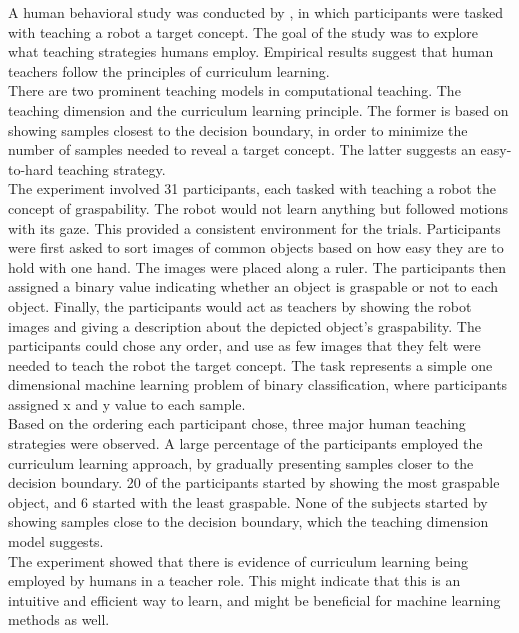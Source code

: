 


A human behavioral study was conducted by \citep{Khan_human_teach}, in which participants were tasked with teaching a robot a target concept. The goal of the study was to explore what teaching strategies humans employ. Empirical results suggest that human teachers follow the principles of curriculum learning. \\

There are two prominent teaching models in computational teaching. The teaching dimension and the curriculum  learning principle. The former is based on showing samples closest to the decision boundary, in order to minimize the number of samples needed to reveal a target concept. The latter suggests an easy-to-hard teaching strategy. \\

The experiment involved 31 participants, each tasked with teaching a robot the concept of graspability. The robot would not learn anything but followed motions with its gaze. This provided a consistent environment for the trials. Participants were first asked to sort images of common objects based on how easy they are to hold with one hand. The images were placed along a ruler.  The participants then assigned a binary value indicating whether an object is graspable or not to each object. Finally, the participants would act as teachers by showing the robot images and giving a description about the depicted object's graspability. The participants could chose any order, and use as few images that they felt were needed to teach the robot the target concept. The task represents a simple one dimensional machine learning problem of binary classification, where participants assigned x and y value to each sample. \\

Based on the ordering each participant chose, three major human teaching strategies were observed. A large percentage of the participants employed the curriculum learning approach, by gradually presenting samples closer to the decision boundary. 20 of the participants started by showing the most graspable object, and 6 started with the least graspable.  None of the subjects started by showing samples close to the decision boundary, which the teaching dimension model suggests.\\

The experiment showed that there is evidence of curriculum learning being employed by humans in a teacher role. This might indicate that this is an intuitive and efficient way to learn, and might be beneficial for machine learning methods as well. \\
